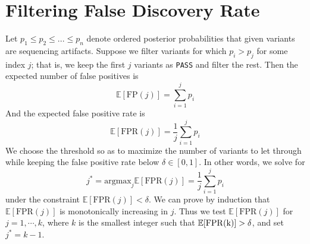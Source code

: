 \documentclass[nofootinbib,amssymb,amsmath]{revtex4}
\newcommand{\code}[1]{\texttt{#1}}
\begin{document}
\section{Filtering False Discovery Rate}

Let $p_1 \leq p_2 \leq ... \leq p_n$ denote ordered posterior probabilities that given variants are sequencing artifacts. Suppose we filter variants for which $p_i > p_j$ for some index $j$; that is, we keep the first $j$ variants as \code{PASS} and filter the rest. Then the expected number of false positives is
\begin{equation}
\mathbb{E} [ \mathrm{FP}(j)] = \sum_{i = 1}^{j} p_i
\end{equation}
And the expected false positive rate is
\begin{equation} \label{eq:fpr}
\mathbb{E} [ \mathrm{FPR}(j)]= \frac{1}{j} {\sum_{i = 1}^{j} p_i}
\end{equation}
We choose the threshold so as to maximize the number of variants to let through while keeping the false positive rate below $\delta \in [0, 1]$. In other words, we solve for
\begin{equation}
j^* = \mathrm{argmax}_j \mathbb{E} [ \mathrm{FPR}(j)]= \frac{1}{j} \sum_{i = 1}^{j} p_i
\end{equation}
under the constraint $ \mathbb{E} [ \mathrm{FPR}(j)] < \delta$. We can prove by induction that $\mathbb{E} [ \mathrm{FPR}(j)]$ is monotonically increasing in $j$. Thus we test $\mathbb{E} [ \mathrm{FPR}(j)]$ for $j = 1, \cdots, k$, where $k$ is the smallest integer such that $\mathbb{E} [ \rm{FPR}(k)] > \delta$, and set $j^* = k-1$. 
\end{document}

